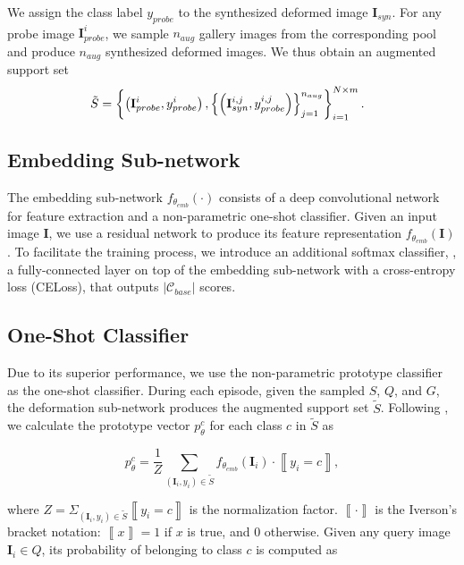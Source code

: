 \documentclass[10pt,letterpaper,twocolumn]{article}
\begin{document}
We assign
the class label $y_{probe}$ to the synthesized deformed image $\mathbf{I}_{syn}$.\textcolor{red}{{}
}For any probe image $\mathbf{I}_{probe}^{i}$, we sample $n_{aug}$
gallery images from the corresponding pool and produce $n_{aug}$ synthesized
deformed images. We thus
obtain an augmented support set 
\noindent 
\begin{equation}
\hspace{-0.1in}
\tilde{S}=\left\{ \left( \mathbf{I}^{i}_{probe},y^{i}_{probe}\right),\left\{ \left(\mathbf{I}_{syn}^{i,j},y_{probe}^{i,j}\right)\right\}_{j=1}^{n_{aug}}\right\}_{i=1}^{N\times m}.\label{eq:aug_set}
\end{equation}




\subsection{Embedding Sub-network }
The embedding sub-network $f_{\theta_{emb}}(\cdot)$
consists of a deep convolutional network for feature extraction and
a non-parametric one-shot classifier.
Given an input image $\mathbf{I}$, we use a residual network \cite{he2015deep}
to produce its feature representation $f_{\theta_{emb}}\left(\mathbf{I}\right)$.
To facilitate the training process, we introduce an additional softmax classifier, \ie, a fully-connected
layer on top of the embedding sub-network with a cross-entropy loss
(CELoss), that outputs $|\mathcal{C}_{base}|$ scores. 

\subsection{One-Shot Classifier}

Due to its superior performance, we use the non-parametric prototype
classifier \cite{prototype_network} as the one-shot classifier. During
each episode, given the sampled $S$, $Q$, and $G$, the deformation
sub-network produces the augmented support set $\tilde{S}$. Following
\cite{prototype_network}, we calculate the prototype vector $p_{\theta}^{c}$
for each class $c$ in $\tilde{S}$ as

\begin{equation}
p_{\theta}^{c}=\frac{1}{Z}\sum_{(\mathbf{I}_{i},y_{i})\in\tilde{S}}f_{\theta_{emb}}\left(\mathbf{I}_{i}\right)\cdot\left\llbracket y_{i}=c\right\rrbracket ,\label{eq:p_thetat}
\end{equation}

\noindent where $Z=\Sigma_{(\mathbf{I}_{i},y_{i})\in\tilde{S}}\left\llbracket y_{i}=c\right\rrbracket $
is the normalization factor. $\left\llbracket \cdot\right\rrbracket $
is the Iverson's bracket notation: $\left\llbracket x\right\rrbracket =1$
if $x$ is true, and $0$ otherwise. Given any query image $\mathbf{I}_{i}\in Q$,
its probability of belonging to class $c$ is computed as
\end{document}
